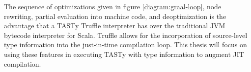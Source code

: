 The sequence of optimizations given in figure \ref{diagram:graal-loop}, node rewriting, partial evaluation into machine code, and deoptimization is the advantage that a TASTy Truffle interpreter has over the traditional JVM bytecode interpreter for Scala.
Truffle allows for the incorporation of source-level type information into the just-in-time compilation loop.
This thesis will focus on using these features in executing TASTy with type information to augment JIT compilation.


